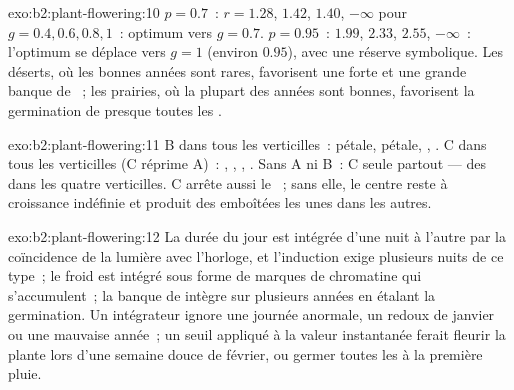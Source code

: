 \begin{solution}{exo:b2:plant-flowering:10}
$p = 0.7$~: $r = 1.28$, $1.42$, $1.40$, $-\infty$ pour
$g = 0.4, 0.6, 0.8,
1$~: optimum vers $g = 0.7$. $p = 0.95$~: $1.99$, $2.33$, $2.55$,
$-\infty$~: l'optimum se déplace vers $g = 1$ (environ $0.95$), avec une
réserve symbolique. Les déserts, où les bonnes années sont rares,
favorisent une forte  et une grande banque de ~; les
prairies, où la plupart des années sont bonnes, favorisent la
germination de presque toutes les .
\end{solution}

\begin{solution}{exo:b2:plant-flowering:11}
B dans tous les verticilles~: pétale, pétale, , . C dans
tous les verticilles (C réprime A)~: , , ,
. Sans A ni B~: C seule partout --- des  dans les quatre
verticilles. C arrête aussi le ~; sans elle, le centre reste à
croissance indéfinie et produit des  emboîtées les unes dans les
autres.
\end{solution}

\begin{solution}{exo:b2:plant-flowering:12}
La durée du jour est intégrée d'une nuit à l'autre par la coïncidence de
la lumière avec l'horloge, et l'induction exige plusieurs nuits de ce
type~; le froid est intégré sous forme de marques de chromatine qui
s'accumulent~; la banque de  intègre sur plusieurs années en
étalant la germination. Un intégrateur ignore une journée anormale, un
redoux de janvier ou une mauvaise année~; un seuil appliqué à la valeur
instantanée ferait fleurir la plante lors d'une semaine douce de février,
ou germer toutes les  à la première pluie.
\end{solution}

